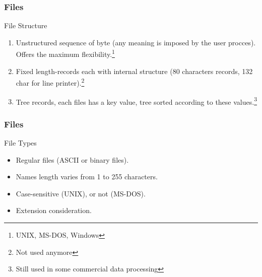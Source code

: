 \begin{frame}
  \frametitle{Files}
  \begin{block}{File Structure}
    \begin{enumerate}
      \item Unstructured sequence of byte (any meaning is imposed by the user procces). Offers the maximum flexibility.\footnote{UNIX, MS-DOS, Windows}
      \item Fixed length-records each with internal structure (80 characters records, 132 char for line printer).\footnote{Not used anymore}
      \item Tree records, each files has a key value, tree sorted according to these values.\footnote{Still used in some commercial data processing}
    \end{enumerate}
  \end{block}
\end{frame}

\begin{frame}
  \frametitle{Files}
  \begin{block}{File Types}
    \begin{itemize}
      \item Regular files (ASCII or binary files).
      \item Names length varies from 1 to 255 characters.
      \item Case-sensitive (UNIX), or not (MS-DOS).
      \item Extension consideration.
    \end{itemize}
  \end{block}
\end{frame}

